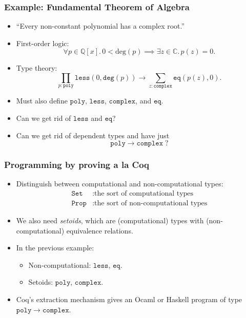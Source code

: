 \documentclass[t]{beamer}
\newcommand{\QQ}{\mathbb{Q}}
\newcommand{\CC}{\mathbb{C}}
\begin{document}
\begin{frame}
  \frametitle{Example: Fundamental Theorem of Algebra}

  \begin{itemize}
  \item ``Every non-constant polynomial has a complex root.''
  \item First-order logic:
    \begin{equation*}
      \forall p \in \QQ[x] .\,
      0 < \mathrm{deg}(p) \implies \exists z \in \CC .\, p(z) = 0.
    \end{equation*}
  \item Type theory:
    \begin{equation*}
      \textstyle
      \prod_{p : \mathtt{poly}} \mathtt{less}(0,
      \mathtt{deg}(p)) \to
      \sum_{z : \mathtt{complex}} \mathtt{eq}(p(z),0).
    \end{equation*}
  \item Must also define $\mathtt{poly}$, $\mathtt{less}$, $\mathtt{complex}$, and $\mathtt{eq}$.
  \item Can we get rid of $\mathtt{less}$ and $\mathtt{eq}$?
  \item Can we get rid of dependent types and have just
    \begin{equation*}
      \mathtt{poly} \to \mathtt{complex} \; ?
    \end{equation*}
  \end{itemize}

\end{frame}

\begin{frame}
  \frametitle{Programming by proving a la Coq}

  \begin{itemize}
  \item Distinguish between computational and non-computational types:
    \begin{align*}
      \mathtt{Set} &: \text{the sort of computational types} \\
      \mathtt{Prop} &: \text{the sort of non-computational types}
    \end{align*}
  \item We also need \emph{setoids}, which are (computational) types
    with (non-computational) equivalence relations.
  \item In the previous example:
    \begin{itemize}
    \item Non-computational: $\mathtt{less}$, $\mathtt{eq}$.
    \item Setoids: $\mathtt{poly}$, $\mathtt{complex}$.
    \end{itemize}
  \item Coq's extraction mechanism gives an Ocaml or Haskell program of type
    $\mathtt{poly} \to \mathtt{complex}$.
  \end{itemize}
\end{frame}
\end{document}
